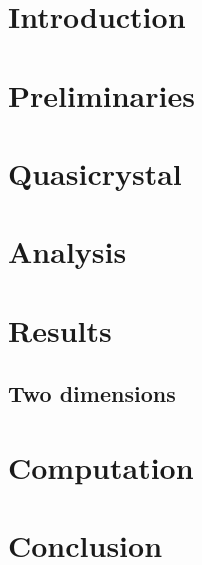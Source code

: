 \documentclass[a4paper,10pt,twoside]{report}
\theoremstyle{remark}
\begin{document}
\clearpage
\thispagestyle{empty}
\cleardoublepage
\thispagestyle{empty}

\tableofcontents


\chapter*{Introduction}


\cleardoublepage
\chapter{Preliminaries}

%
\clearpage
\chapter{Quasicrystal}


\clearpage
\chapter{Analysis}

\pagebreak


\clearpage
\chapter{Results}\label{cha_results}

\clearpage

\clearpage

\clearpage
\section{Two dimensions}


\clearpage
\chapter{Computation}\label{cha_computation}


\chapter*{Conclusion}



\end{document}
